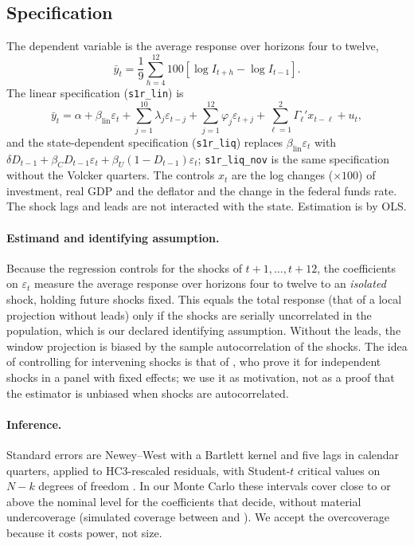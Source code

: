 \documentclass[11pt]{article}
\theoremstyle{remark}
\begin{document}
\subsection{Specification}

The dependent variable is the average response over horizons four to twelve,
\[
\bar y_t=\frac{1}{9}\sum_{h=4}^{12}100\left[\log I_{t+h}-\log I_{t-1}\right].
\]
The linear specification (\texttt{s1r\_lin}) is
\[
\bar y_t=\alpha+\beta_{\text{lin}}\varepsilon_t+\sum_{j=1}^{10}\lambda_j\varepsilon_{t-j}+\sum_{j=1}^{12}\varphi_j\varepsilon_{t+j}
+\sum_{\ell=1}^{2}\Gamma_\ell' x_{t-\ell}+u_t,
\]
and the state-dependent specification (\texttt{s1r\_liq}) replaces $\beta_{\text{lin}}\varepsilon_t$ with
$\delta D_{t-1}+\beta_C D_{t-1}\varepsilon_t+\beta_U(1-D_{t-1})\varepsilon_t$; \texttt{s1r\_liq\_nov} is the same specification
without the Volcker quarters. The controls $x_t$ are the log changes ($\times100$) of investment, real GDP and the deflator and the
change in the federal funds rate. The shock lags and leads are not interacted with the state. Estimation is by OLS.

\paragraph{Estimand and identifying assumption.}
Because the regression controls for the shocks of $t+1,\dots,t+12$, the coefficients on $\varepsilon_t$ measure the average
response over horizons four to twelve to an \emph{isolated} shock, holding future shocks fixed. This equals the total response
(that of a local projection without leads) only if the shocks are serially uncorrelated in the population, which is our declared
identifying assumption. Without the leads, the window projection is biased by the sample autocorrelation of the shocks. The idea
of controlling for intervening shocks is that of \citet{TeulingsZubanov2014}, who prove it for independent shocks in a panel with
fixed effects; we use it as motivation, not as a proof that the estimator is unbiased when shocks are autocorrelated.

\paragraph{Inference.}
Standard errors are Newey--West with a Bartlett kernel and five lags in calendar quarters, applied to HC3-rescaled residuals,
with Student-$t$ critical values on $N-k$ degrees of freedom \citep{NeweyWest1987}. In our Monte Carlo
these intervals cover close to or above the nominal level for the coefficients that decide, without material undercoverage (simulated coverage between \CovAumNwHcLo{} and \CovAumNwHcHi{}). We
accept the overcoverage because it costs power, not size.
\end{document}
